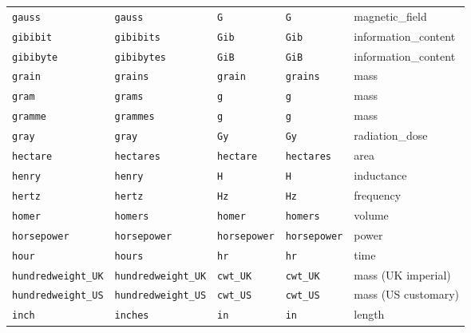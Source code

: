 \begin{landscape}
\begin{center}
\begin{longtable}{|lllll|}
{\tt\footnotesize gauss} & {\tt\footnotesize gauss} & {\tt\footnotesize G} & {\tt\footnotesize G} & magnetic\_field \\
{\tt\footnotesize gibibit} & {\tt\footnotesize gibibits} & {\tt\footnotesize Gib} & {\tt\footnotesize Gib} & information\_content \\
{\tt\footnotesize gibibyte} & {\tt\footnotesize gibibytes} & {\tt\footnotesize GiB} & {\tt\footnotesize GiB} & information\_content \\
{\tt\footnotesize grain} & {\tt\footnotesize grains} & {\tt\footnotesize grain} & {\tt\footnotesize grains} & mass \\
{\tt\footnotesize gram} & {\tt\footnotesize grams} & {\tt\footnotesize g} & {\tt\footnotesize g} & mass \\
{\tt\footnotesize gramme} & {\tt\footnotesize grammes} & {\tt\footnotesize g} & {\tt\footnotesize g} & mass \\
{\tt\footnotesize gray} & {\tt\footnotesize gray} & {\tt\footnotesize Gy} & {\tt\footnotesize Gy} & radiation\_dose \\
{\tt\footnotesize hectare} & {\tt\footnotesize hectares} & {\tt\footnotesize hectare} & {\tt\footnotesize hectares} & area \\
{\tt\footnotesize henry} & {\tt\footnotesize henry} & {\tt\footnotesize H} & {\tt\footnotesize H} & inductance \\
{\tt\footnotesize hertz} & {\tt\footnotesize hertz} & {\tt\footnotesize Hz} & {\tt\footnotesize Hz} & frequency \\
{\tt\footnotesize homer} & {\tt\footnotesize homers} & {\tt\footnotesize homer} & {\tt\footnotesize homers} & volume \\
{\tt\footnotesize horsepower} & {\tt\footnotesize horsepower} & {\tt\footnotesize horsepower} & {\tt\footnotesize horsepower} & power \\
{\tt\footnotesize hour} & {\tt\footnotesize hours} & {\tt\footnotesize hr} & {\tt\footnotesize hr} & time \\
{\tt\footnotesize hundredweight\_UK} & {\tt\footnotesize hundredweight\_UK} & {\tt\footnotesize cwt\_UK} & {\tt\footnotesize cwt\_UK} & mass (UK imperial) \\
{\tt\footnotesize hundredweight\_US} & {\tt\footnotesize hundredweight\_US} & {\tt\footnotesize cwt\_US} & {\tt\footnotesize cwt\_US} & mass (US customary) \\
{\tt\footnotesize inch} & {\tt\footnotesize inches} & {\tt\footnotesize in} & {\tt\footnotesize in} & length \\

\end{longtable}
\end{center}
\end{landscape}
